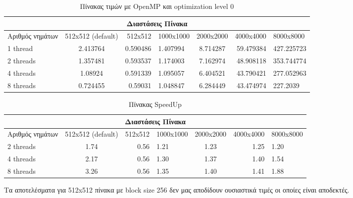 \documentclass[greek,booktabs,8pt,flagBlueCMYK]{report}
\begin{document}
\begin{table}[H]
\begin{center}
\label{tab:4} 
\begin{tabular}{| l | c | r | l | c | r | l |}
  \hline
  \multicolumn{7}{|c|}{Διαστάσεις Πίνακα} \\ \hline
  Αριθμός νημάτων & 512x512 (default) & 512x512 & 1000x1000 & 2000x2000 & 4000x4000 & 8000x8000\\ \hline 
  1 thread   & 2.413764 &   0.590486  &  1.407994   & 8.714287  & 59.479384 &  427.225723 \\ \hline
  2 threads  & 1.357481 &   0.593537  &  1.174003   & 7.162974  & 48.908118 &  353.744774 \\ \hline
  4 threads  & 1.08924  &   0.591339  &  1.095057   & 6.404521  & 43.790421 &  277.052963 \\ \hline
  8 threads  & 0.724455 &   0.59031  &  1.048847   & 6.284449  & 43.474974  &  227.2039   \\ \hline
\end{tabular}
\caption {Πίνακας τιμών με OpenMP και optimization level 0}
\end{center}
\end{table}

\begin{table}[H]
\begin{center}
\label{tab:5} 
\begin{tabular}{| l | c | r | l | c | r | l |}
  \hline
  \multicolumn{7}{|c|}{Διαστάσεις Πίνακα} \\ \hline
  Αριθμός νημάτων & 512x512 (default) & 512x512 & 1000x1000 & 2000x2000 & 4000x4000 & 8000x8000 \\ \hline 
  2 threads  & 1.74 & 0.56 & 1.21 & 1.23 & 1.25 & 1.20 \\ \hline
  4 threads  & 2.17 & 0.56 & 1.30 & 1.37 & 1.40 & 1.54 \\ \hline
  8 threads  & 3.26 & 0.56 & 1.35 & 1.40 & 1.41 & 1.88 \\ \hline
\end{tabular}
\caption {Πίνακας SpeedUp}
\end{center}
\end{table}

Τα αποτελέσματα για 512x512 πίνακα με block size 256 δεν μας αποδίδουν ουσιαστικά τιμές οι οποίες είναι αποδεκτές.
\end{document}
